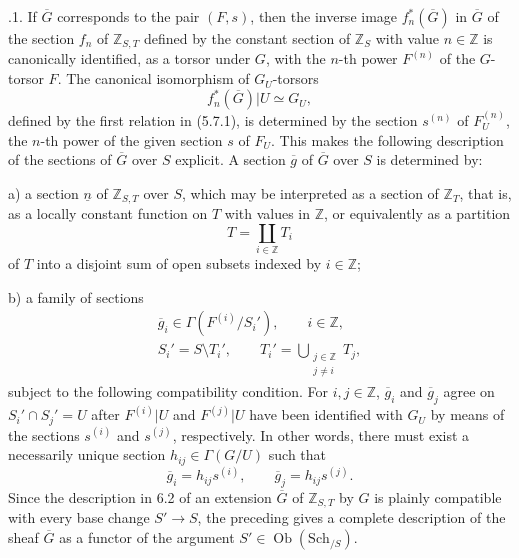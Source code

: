 
\medskip
{}.1.  If $\overline G$ corresponds to the pair $(F,s)$, then the
inverse image $f_n^*(\overline G)$ in $\overline G$ of the section $f_n$ of
$\mathbb Z_{S,T}$ defined by the constant section of $\mathbb Z_S$ with
value $n\in\mathbb Z$ is canonically identified, as a torsor under $G$, with
the $n$-th power $F^{(n)}$ of the $G$-torsor $F$.  The canonical isomorphism
of $G_U$-torsors
\[
 f_n^*(\overline G)|U\simeq G_U,
\]
defined by the first relation in (5.7.1), is determined by the section
$s^{(n)}$ of $F_U^{(n)}$, the $n$-th power of the given section $s$ of
$F_U$.  This makes the following description of the sections of
$\overline G$ over $S$ explicit.  A section $\overline g$ of $\overline G$
over $S$ is determined by:

\smallskip
\noindent a) a section $\underline n$ of $\mathbb Z_{S,T}$ over $S$, which
may be interpreted as a section of $\mathbb Z_T$, that is, as a locally
constant function on $T$ with values in $\mathbb Z$, or equivalently as a
partition
\[
 T=\coprod_{i\in\mathbb Z}T_i
\]
of $T$ into a disjoint sum of open subsets indexed by $i\in\mathbb Z$;

\smallskip
\noindent b) a family of sections
\[
 \begin{gathered}
  \overline g_i\in\Gamma(F^{(i)}/S_i'),\qquad i\in\mathbb Z,\\
  S_i'=S\setminus T_i',\qquad
  T_i'=\displaystyle\bigcup_{\substack{j\in\mathbb Z\\j\ne i}}T_j,
 \end{gathered}
\]
subject to the following compatibility condition.  For $i,j\in\mathbb Z$,
$\overline g_i$ and $\overline g_j$ agree on $S_i'\cap S_j'=U$ after
$F^{(i)}|U$ and $F^{(j)}|U$ have been identified with $G_U$ by means of the
sections $s^{(i)}$ and $s^{(j)}$, respectively.  In other words, there must
exist a necessarily unique section $h_{ij}\in\Gamma(G/U)$ such that
\[
 \overline g_i=h_{ij}s^{(i)},\qquad
 \overline g_j=h_{ij}s^{(j)}.
\]
Since the description in 6.2 of an extension $\overline G$ of
$\mathbb Z_{S,T}$ by $G$ is plainly compatible with every base change
$S'\to S$, the preceding gives a complete description of the sheaf
$\overline G$ as a functor of the argument
$S'\in\operatorname{Ob}(\mathrm{Sch}_{/S})$.

